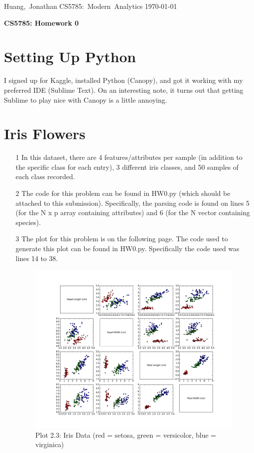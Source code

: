 \documentclass[11pt]{article}
\begin{document}
\hfill\vbox{\hbox{Huang, Jonathan}
      \hbox{CS5785: Modern Analytics}  
      \hbox{\today}}\par

\bigskip
\centerline{\Large\bf CS5785: Homework 0}\par
\bigskip

\section{Setting Up Python}

I signed up for Kaggle, installed Python (Canopy), and got it working with my preferred IDE (Sublime Text). On an interesting note, it turns out that getting Sublime to play nice with Canopy is a little annoying. 

\section{Iris Flowers}
\begin{enumerate}
\item[1] In this dataset, there are 4 features/attributes per sample (in addition to the specific class for each entry), 3 different iris classes, and 50 samples of each class recorded.

\item[2] The code for this problem can be found in HW0.py (which should be attached to this submission). Specifically, the parsing code is found on lines 5 (for the N x p array containing attributes) and 6 (for the N vector containing species).

\item[3] The plot for this problem is on the following page. The code used to generate this plot can be found in HW0.py. Specifically the code used was lines 14 to 38.

\newpage

\begin{figure}[h]
\centering
  \includegraphics[scale=0.4]{HW0plot.png}
\caption{Plot 2.3: Iris Data (red = setosa, green = versicolor, blue = virginica)}
\end{figure}

\end{enumerate}
\end{document}
